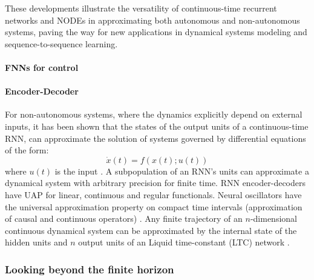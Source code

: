 \documentclass{article}
\theoremstyle{definition}
\theoremstyle{remark}
\newcounter{ct}
\begin{document}
These developments illustrate the versatility of continuous-time recurrent networks and NODEs in approximating both autonomous and non-autonomous systems, paving the way for new applications in dynamical systems modeling and sequence-to-sequence learning.


\paragraph{FNNs for control}
\citep{psaltis1988multilayered} \citep{li1989control,chen1992adaptive}


\paragraph{Encoder-Decoder}
For non-autonomous systems, where the dynamics explicitly depend on external inputs, it has been shown that the states of the output units of a continuous-time RNN, can approximate the solution of systems governed by differential equations of the form:
\[
\dot{x}(t) = f(x(t); u(t)) 
\]
where $u(t)$ is the input \citep{garces2012strategies}. %
A subpopulation of an RNN's units can approximate a dynamical system with arbitrary precision for finite time\citep{kambhampati2000approximation}. %
RNN encoder-decoders have UAP for linear, continuous and regular functionals\citep{li2021approximationencdec}.
Neural oscillators have the universal approximation property on compact time intervals (approximation of causal and continuous operators) \citep{lanthaler2023neuraloscillators}.
%
Any finite trajectory of an $n$-dimensional continuous dynamical system can be approximated by the internal state of the hidden units and $n$ output units of an Liquid time-constant (LTC) network \citep{hasani2018liquid}.





\subsubsection{Looking beyond the finite horizon} %
\end{document}
